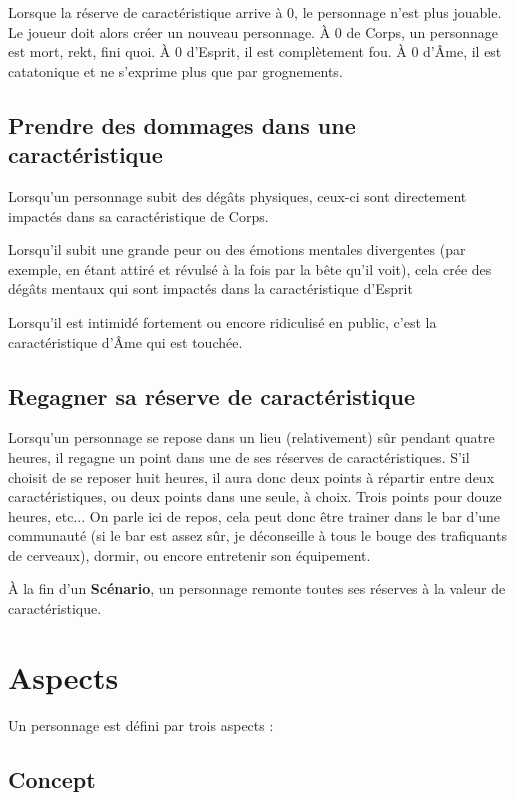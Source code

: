 \documentclass[a4paper,10pt,twoside,twocolumn,openany,bg=print,justified]{dndbook}
\begin{document}
Lorsque la réserve de caractéristique arrive à 0, le personnage n'est plus jouable. Le joueur doit alors créer un nouveau personnage. À 0 de Corps, un personnage est mort, rekt, fini quoi. À 0 d'Esprit, il est complètement fou. À 0 d'Âme, il est catatonique et ne s'exprime plus que par grognements.

\subsection*{Prendre des dommages dans une caractéristique}

Lorsqu'un personnage subit des dégâts physiques, ceux-ci sont directement impactés dans sa caractéristique de Corps.

Lorsqu'il subit une grande peur ou des émotions mentales divergentes (par exemple, en étant attiré et révulsé à la fois par la bête qu'il voit), cela crée des dégâts mentaux qui sont impactés dans la caractéristique d'Esprit

Lorsqu'il est intimidé fortement ou encore ridiculisé en public, c'est la caractéristique d'Âme qui est touchée.

\subsection*{Regagner sa réserve de caractéristique}

Lorsqu'un personnage se repose dans un lieu (relativement) sûr pendant quatre heures, il regagne un point dans une de ses réserves de caractéristiques. S'il choisit de se reposer huit heures, il aura donc deux points à répartir entre deux caractéristiques, ou deux points dans une seule, à choix. Trois points pour douze heures, etc... On parle ici de repos, cela peut donc être trainer dans le bar d'une communauté (si le bar est assez sûr, je déconseille à tous le bouge des trafiquants de cerveaux), dormir, ou encore entretenir son équipement.

À la fin d'un \textbf{Scénario}, un personnage remonte toutes ses réserves à la valeur de caractéristique.

\section{Aspects}

Un personnage est défini par trois aspects :

\subsection*{Concept}
\end{document}
